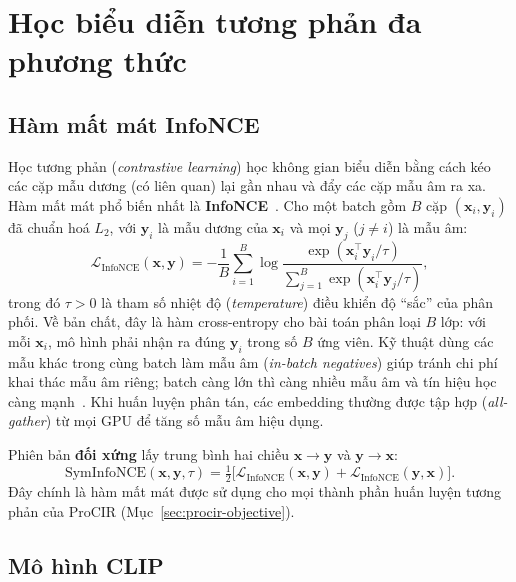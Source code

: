 \section{Học biểu diễn tương phản đa phương thức}\label{sec:contrastive}

\subsection{Hàm mất mát InfoNCE}

Học tương phản (\emph{contrastive learning}) học không gian biểu diễn bằng cách kéo các cặp mẫu dương (có liên quan) lại gần nhau và đẩy các cặp mẫu âm ra xa. Hàm mất mát phổ biến nhất là \textbf{InfoNCE}~\cite{oord2018cpc}. Cho một batch gồm $B$ cặp $(\mathbf{x}_i, \mathbf{y}_i)$ đã chuẩn hoá $L_2$, với $\mathbf{y}_i$ là mẫu dương của $\mathbf{x}_i$ và mọi $\mathbf{y}_j$ ($j \ne i$) là mẫu âm:
\begin{equation}
    \mathcal{L}_{\mathrm{InfoNCE}}(\mathbf{x}, \mathbf{y}) = -\frac{1}{B}\sum_{i=1}^{B} \log \frac{\exp(\mathbf{x}_i^\top \mathbf{y}_i / \tau)}{\sum_{j=1}^{B}\exp(\mathbf{x}_i^\top \mathbf{y}_j / \tau)},
    \label{eq:infonce}
\end{equation}
trong đó $\tau > 0$ là tham số nhiệt độ (\emph{temperature}) điều khiển độ ``sắc'' của phân phối. Về bản chất, đây là hàm cross-entropy cho bài toán phân loại $B$ lớp: với mỗi $\mathbf{x}_i$, mô hình phải nhận ra đúng $\mathbf{y}_i$ trong số $B$ ứng viên. Kỹ thuật dùng các mẫu khác trong cùng batch làm mẫu âm (\emph{in-batch negatives}) giúp tránh chi phí khai thác mẫu âm riêng; batch càng lớn thì càng nhiều mẫu âm và tín hiệu học càng mạnh~\cite{chen2020simclr}. Khi huấn luyện phân tán, các embedding thường được tập hợp (\emph{all-gather}) từ mọi GPU để tăng số mẫu âm hiệu dụng.

Phiên bản \textbf{đối xứng} lấy trung bình hai chiều $\mathbf{x} \to \mathbf{y}$ và $\mathbf{y} \to \mathbf{x}$:
\begin{equation}
    \mathrm{SymInfoNCE}(\mathbf{x}, \mathbf{y}, \tau) = \tfrac{1}{2}\big[\mathcal{L}_{\mathrm{InfoNCE}}(\mathbf{x}, \mathbf{y}) + \mathcal{L}_{\mathrm{InfoNCE}}(\mathbf{y}, \mathbf{x})\big].
    \label{eq:syminfonce}
\end{equation}
Đây chính là hàm mất mát được sử dụng cho mọi thành phần huấn luyện tương phản của ProCIR (Mục~\ref{sec:procir-objective}).

\subsection{Mô hình CLIP}

